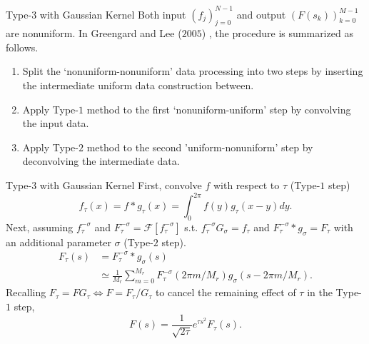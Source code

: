 \documentclass{beamer}
\begin{document}
\begin{frame}{Type-$3$ with Gaussian Kernel}
  Both input $(f_{j})_{j=0}^{N-1}$ and output $(F(s_{k}))_{k=0}^{M-1}$ are nonuniform.
  In Greengard and Lee ($2005$) \cite{JCP-2005-Greengard}, the procedure is summarized
  as follows.
  \begin{enumerate}
    \item Split the `nonuniform-nonuniform' data processing into two steps
    by inserting the intermediate uniform data construction between.
    \item Apply Type-$1$ method to the first `nonuniform-uniform' step by convolving the input data.
    \item Apply Type-$2$ method to the second 'uniform-nonuniform' step by deconvolving the intermediate data.
  \end{enumerate}
\end{frame}

\begin{frame}{Type-$3$ with Gaussian Kernel}
  First, convolve $f$ with respect to $\tau$ (Type-$1$ step)
  \begin{equation}
      f_{\tau}(x) = f\ast g_{\tau} (x) = \int_{0}^{2\pi} f(y)g_{\tau}(x-y) dy.
  \end{equation}
  Next, assuming $f_{\tau}^{-\sigma}$ and $F_{\tau}^{-\sigma} = \mathcal{F}[f_{\tau}^{-\sigma}]$
  s.t.
  $f_{\tau}^{-\sigma}G_{\sigma} = f_{\tau}$ and $F_{\tau}^{-\sigma}\ast g_{\sigma} = F_{\tau}$
  with an additional parameter $\sigma$ (Type-$2$ step).
  \begin{align}
    F_{\tau}(s) &= F_{\tau}^{-\sigma}\ast g_{\sigma} (s) \\
    &\simeq \frac{1}{M_{r}}\sum_{m=0}^{M_{r}}
            F_{\tau}^{-\sigma}(2\pi m/M_{r})g_{\sigma}(s - 2\pi m/M_{r}).
  \end{align}
  Recalling $F_{\tau} = FG_{\tau} \Leftrightarrow F = F_{\tau}/G_{\tau}$
  to cancel the remaining effect of $\tau$ in the Type-$1$ step,
  \begin{equation}
    F(s) = \frac{1}{\sqrt{2\tau}}e^{\tau s^2}F_{\tau}(s).
  \end{equation}
\end{frame}
\end{document}

